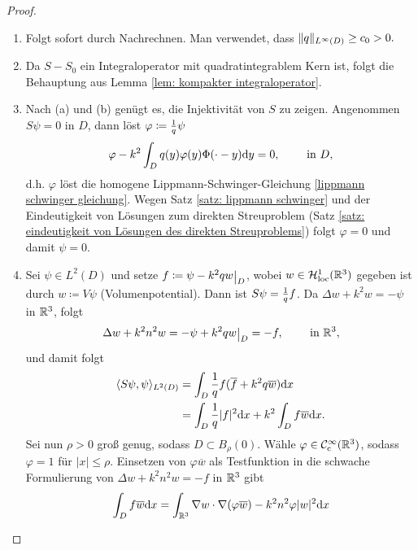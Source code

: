 \begin{proof}\
	\begin{enumerate}[label=(\alph*)]
		\item Folgt sofort durch Nachrechnen. Man verwendet, dass \(\|q\|_{L^\infty(D)}\geq c_0>0.\)
		\item Da \(S-S_0\) ein Integraloperator mit quadratintegrablem Kern ist, folgt die Behauptung aus Lemma \ref{lem: kompakter integraloperator}.
		\item Nach (a) und (b) genügt es, die Injektivität von \(S\) zu zeigen. Angenommen \(S\psi=0\) in \(D\), dann löst \(\varphi\coloneqq\frac{1}{q}\psi\)
		\begin{equation*}
			\varphi-k^2\int_Dq(y)\varphi(y)\Phi(\cdot-y)\mathrm{d}y=0,\qquad\text{ in }D,
		\end{equation*}
		d.h. \(\varphi\) löst die homogene Lippmann-Schwinger-Gleichung \eqref{lippmann schwinger gleichung}. Wegen Satz \ref{satz: lippmann schwinger} und der Eindeutigkeit von Lösungen zum direkten Streuproblem (Satz \ref{satz: eindeutigkeit von Lösungen des direkten Streuproblems}) folgt \(\varphi=0\) und damit \(\psi=0\).
		\item Sei \(\psi\in L^2(D)\) und setze \(f\coloneqq \psi-k^2\kontrast w\restrict{D}\), wobei \(w\in\mathcal{H}_{\mathrm{loc}}^1(\mathbb{R}^3)\) gegeben ist durch \(w\coloneqq V\psi\) (Volumenpotential). Dann ist \(S\psi=\frac{1}{q}f\). Da \(\Delta w+k^2w=-\psi\) in \(\mathbb{R}^3\), folgt
		\begin{equation*}
			\Delta w+k^2n^2w=-\psi+k^2\kontrast w\restrict{D}=-f,\qquad\te{ in }\R^3,
		\end{equation*}
		und damit folgt
		\begin{equation}
			\label{beweis injektivität operator S}
			\begin{aligned}
				\langle S\psi,\psi\rangle_{L^2(D)}
				& = \int_D\frac{1}{q}f(\overline{f}+k^2q\overline{w})\mathrm{d}x\\
				& = \int_D\frac{1}{q}|f|^2\mathrm{d}x + k^2\int_Df\overline{w}\mathrm{d}x.
			\end{aligned}
		\end{equation}
		Sei nun \(\rho>0\) groß genug, sodass \(D\subset B_\rho(0)\). Wähle \(\varphi\in\mathcal{C}_{\mathrm{c}}^\infty(\mathbb{R}^3)\), sodass \(\varphi=1\) für \(|x|\leq\rho\). Einsetzen von \(\varphi\overline{w}\) als Testfunktion in die schwache Formulierung von \(\Delta w+k^2n^2w = -f\) in \(\mathbb{R}^3\) gibt
		\begin{align*}
			\int_Df\overline{w}\dx
			&=\int_{\R^3}\nabla w\cdot\nabla(\varphi\overline{w})-k^2n^2\varphi|w|^2\dx\\

\end{align*}
\end{enumerate}
\end{proof}
